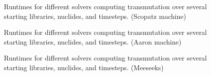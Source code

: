
\begin{figure}[!ht]
\centering
\resizebox{0.9\textwidth}{!}{}
\caption{Runtimes for different solvers computing transmutation over several starting libraries, nuclides, and timesteps.
(Scopatz machine)}
\label{fig:origen-scopatz}
\end{figure}

\begin{figure}[!ht]
\centering
\resizebox{0.9\textwidth}{!}{}
\caption{Runtimes for different solvers computing transmutation over several starting libraries, nuclides, and timesteps.
 (Aaron machine)}
\label{fig:origen-aaron}
\end{figure}

\begin{figure}[!ht]
\centering
\resizebox{0.9\textwidth}{!}{}
\caption{Runtimes for different solvers computing transmutation over several starting libraries, nuclides, and timesteps.
 (Meeseeks)}
\label{fig:origen-meeseeks}
\end{figure}
